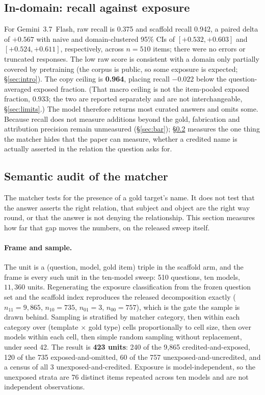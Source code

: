 \documentclass[10pt,twocolumn]{article}
\begin{document}
\subsection{In-domain: recall against exposure}\label{sec:indomain}
For Gemini~3.7~Flash, raw recall is 0.375 and scaffold recall 0.942, a paired delta of $\mathbf{+0.567}$ with naive and domain-clustered 95\% CIs of $[+0.532,+0.603]$ and $[+0.524,+0.611]$, respectively, across $n=510$ items; there were no errors or truncated responses. The low raw score is consistent with a domain only partially covered by pretraining (the corpus is public, so some exposure is expected; \S\ref{sec:intro}). The copy ceiling is \textbf{0.964}, placing recall $-0.022$ below the question-averaged exposed fraction. (That macro ceiling is not the item-pooled exposed fraction, $0.933$; the two are reported separately and are not interchangeable, \S\ref{sec:limits}.) The model therefore returns most curated answers and omits some. Because recall does not measure additions beyond the gold, fabrication and attribution precision remain unmeasured (\S\ref{sec:bar}); \S\ref{sec:audit} measures the one thing the matcher hides that the paper can measure, whether a credited name is actually asserted in the relation the question asks for.

\subsection{Semantic audit of the matcher}\label{sec:audit}
The matcher tests for the presence of a gold target's name. It does not test that the answer asserts the right relation, that subject and object are the right way round, or that the answer is not denying the relationship. This section measures how far that gap moves the numbers, on the released sweep itself.

\paragraph{Frame and sample.} The unit is a (question, model, gold item) triple in the scaffold arm, and the frame is every such unit in the ten-model sweep: 510 questions, ten models, $11{,}360$ units. Regenerating the exposure classification from the frozen question set and the scaffold index reproduces the released decomposition exactly ($n_{11}=9{,}865$, $n_{10}=735$, $n_{01}=3$, $n_{00}=757$), which is the gate the sample is drawn behind. Sampling is stratified by matcher category, then within each category over (template $\times$ gold type) cells proportionally to cell size, then over models within each cell, then simple random sampling without replacement, under seed 42. The result is \textbf{423 units}: 240 of the 9{,}865 credited-and-exposed, 120 of the 735 exposed-and-omitted, 60 of the 757 unexposed-and-uncredited, and a census of all 3 unexposed-and-credited. Exposure is model-independent, so the unexposed strata are 76 distinct items repeated across ten models and are not independent observations.
\end{document}
